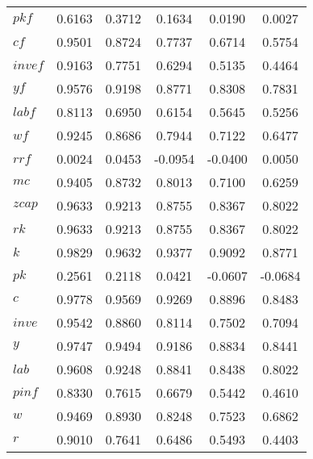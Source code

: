 \begin{center}
\begin{longtable}{lccccc}
$pkf       $	 & 	     0.6163	 & 	     0.3712	 & 	     0.1634	 & 	     0.0190	 & 	     0.0027 \\ 
$cf        $	 & 	     0.9501	 & 	     0.8724	 & 	     0.7737	 & 	     0.6714	 & 	     0.5754 \\ 
$invef     $	 & 	     0.9163	 & 	     0.7751	 & 	     0.6294	 & 	     0.5135	 & 	     0.4464 \\ 
$yf        $	 & 	     0.9576	 & 	     0.9198	 & 	     0.8771	 & 	     0.8308	 & 	     0.7831 \\ 
$labf      $	 & 	     0.8113	 & 	     0.6950	 & 	     0.6154	 & 	     0.5645	 & 	     0.5256 \\ 
$wf        $	 & 	     0.9245	 & 	     0.8686	 & 	     0.7944	 & 	     0.7122	 & 	     0.6477 \\ 
$rrf       $	 & 	     0.0024	 & 	     0.0453	 & 	    -0.0954	 & 	    -0.0400	 & 	     0.0050 \\ 
$mc        $	 & 	     0.9405	 & 	     0.8732	 & 	     0.8013	 & 	     0.7100	 & 	     0.6259 \\ 
$zcap      $	 & 	     0.9633	 & 	     0.9213	 & 	     0.8755	 & 	     0.8367	 & 	     0.8022 \\ 
$rk        $	 & 	     0.9633	 & 	     0.9213	 & 	     0.8755	 & 	     0.8367	 & 	     0.8022 \\ 
$k         $	 & 	     0.9829	 & 	     0.9632	 & 	     0.9377	 & 	     0.9092	 & 	     0.8771 \\ 
$pk        $	 & 	     0.2561	 & 	     0.2118	 & 	     0.0421	 & 	    -0.0607	 & 	    -0.0684 \\ 
$c         $	 & 	     0.9778	 & 	     0.9569	 & 	     0.9269	 & 	     0.8896	 & 	     0.8483 \\ 
$inve      $	 & 	     0.9542	 & 	     0.8860	 & 	     0.8114	 & 	     0.7502	 & 	     0.7094 \\ 
$y         $	 & 	     0.9747	 & 	     0.9494	 & 	     0.9186	 & 	     0.8834	 & 	     0.8441 \\ 
$lab       $	 & 	     0.9608	 & 	     0.9248	 & 	     0.8841	 & 	     0.8438	 & 	     0.8022 \\ 
$pinf      $	 & 	     0.8330	 & 	     0.7615	 & 	     0.6679	 & 	     0.5442	 & 	     0.4610 \\ 
$w         $	 & 	     0.9469	 & 	     0.8930	 & 	     0.8248	 & 	     0.7523	 & 	     0.6862 \\ 
$r         $	 & 	     0.9010	 & 	     0.7641	 & 	     0.6486	 & 	     0.5493	 & 	     0.4403 \\ 

\end{longtable}
\end{center}
